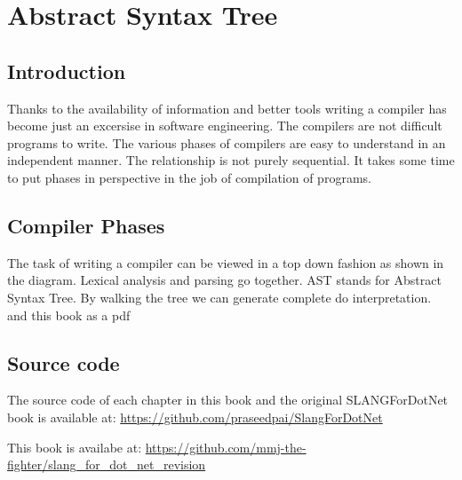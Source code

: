 \chapter{Abstract Syntax Tree}
\section{Introduction}
Thanks to the availability of information and better tools writing a compiler has become just an excersise in software engineering. The compilers are not difficult programs to write. The various phases of compilers are easy to understand in an independent manner. The relationship is not purely sequential. It takes some time to put phases in perspective in the job of compilation of programs. 
\section{Compiler Phases}
The task of writing a compiler can be viewed in a top down fashion as shown in the diagram. Lexical analysis and parsing go together. AST stands for Abstract Syntax Tree. By walking the tree we can generate complete do interpretation.
and this book as a pdf \\

 \section{Source code}
 The source code of each chapter in this book and the original SLANGForDotNet book is available at:
 \url{https://github.com/praseedpai/SlangForDotNet}
 
This book is availabe at: 
\url{https://github.com/mmj-the-fighter/slang_for_dot_net_revision}

\clearpage
